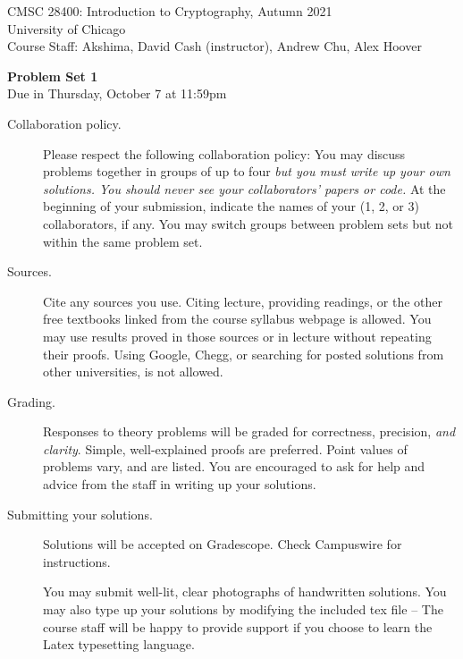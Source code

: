 \documentclass[11pt]{article}
\begin{document}
\sloppy

\noindent 
CMSC 28400: Introduction to Cryptography, Autumn 2021\\
University of Chicago\\
Course Staff: Akshima, David Cash (instructor), Andrew Chu, Alex Hoover

\begin{center}
\LARGE{\textbf{Problem Set 1}}\\
    \large{Due in Thursday, October 7 at 11:59pm}
\end{center}

\vspace{.1in}

\begin{description}

    \item[Collaboration policy.] Please respect the following collaboration
        policy:  You may discuss problems together in groups of up to four
        \emph{but you must write up your own solutions. You should never see
        your collaborators' papers or code.}  At the beginning of your
        submission, indicate the names of your (1, 2, or 3) collaborators, if
        any.   You may switch groups between problem sets but not within the
        same problem set.

    \item[Sources.] Cite any sources you use. Citing lecture, providing
    readings, or the other free textbooks linked from the course syllabus
    webpage is allowed. You may use results proved in those sources or in
    lecture without repeating their proofs.  Using Google, Chegg, or searching
    for posted solutions from other universities, is not allowed.

    \item[Grading.] Responses to theory problems will be graded for
        correctness, precision, \emph{and clarity}.  Simple, well-explained
        proofs are preferred.  Point values of problems vary, and are listed.  
        You are encouraged to ask for help and advice from the staff in writing
        up your solutions.

    \item[Submitting your solutions.] Solutions will be accepted on Gradescope.
    Check Campuswire for instructions.

    You may submit well-lit, clear photographs of handwritten solutions. You may
    also type up your solutions by modifying the included tex file -- The course
    staff will be happy to provide support if you choose to learn the Latex
    typesetting language.

\end{description}
\hrulefill
\end{document}
